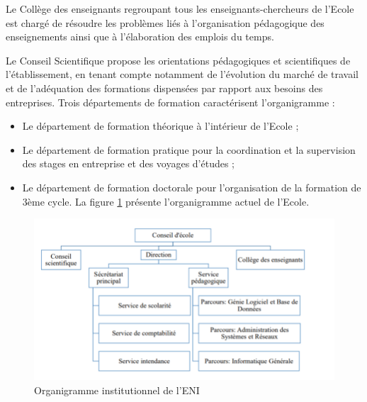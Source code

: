 \documentclass[12pt]{report}
\begin{document}
				Le Collège des enseignants regroupant tous les enseignants-chercheurs de l’Ecole est chargé de résoudre les problèmes liés à l’organisation pédagogique des enseignements ainsi que à l’élaboration des emplois du temps.

				\begin{center}
					\begin{minipage}{\textwidth}
						\hspace{15pt} Le Conseil Scientifique propose les orientations pédagogiques et scientifiques de l’établissement, en tenant compte notamment de l’évolution du marché de travail et de l’adéquation des formations dispensées par rapport aux besoins des entreprises. Trois départements de formation caractérisent l’organigramme :
						\begin{itemize}
							\item Le département de formation théorique à l’intérieur de l’Ecole ;
							\item Le département de formation pratique pour la coordination et la supervision des stages en entreprise et des voyages d’études ;
							\item Le département de formation doctorale pour l’organisation de la formation de 3ème cycle. La figure \ref{fig:figure 1} présente l’organigramme actuel de l’Ecole.
						\end{itemize}
					\end{minipage}
				\end{center}

				\begin{figure}[h]
					  \centering
					  \includegraphics[width=\textwidth]{image4.png}
					  \caption{Organigramme institutionnel de l'ENI}
					  \label{fig:figure 1}
				\end{figure}
	
\end{document}
